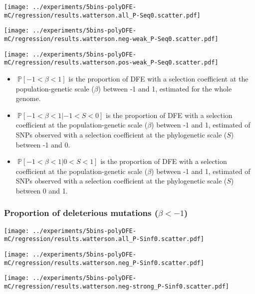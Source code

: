 \documentclass{article}
\newcommand{\proba}{\mathbb{P}}
\newcommand{\Sphy}{S}
\newcommand{\divWeakDel}{-1 < \Sphy < 0}
\newcommand{\divWeakAdv}{0 < \Sphy < 1}
\newcommand{\Spop}{\beta}
\newcommand{\polyDel}{\Spop < -1}
\newcommand{\polyNeutral}{-1 < \Spop < 1}
\begin{document}
    \begin{minipage}{0.32\linewidth}
        \texttt{[image: ../experiments/5bins-polyDFE-mC/regression/results.watterson.all\_P-Seq0.scatter.pdf]}
    \end{minipage}
    \begin{minipage}{0.32\linewidth}
        \texttt{[image: ../experiments/5bins-polyDFE-mC/regression/results.watterson.neg-weak\_P-Seq0.scatter.pdf]}
    \end{minipage}
    \begin{minipage}{0.32\linewidth}
        \texttt{[image: ../experiments/5bins-polyDFE-mC/regression/results.watterson.pos-weak\_P-Seq0.scatter.pdf]}
    \end{minipage}

    \begin{itemize}
        \item $\ \proba [ \polyNeutral ]$ is the proportion of DFE with a selection coefficient at the population-genetic scale ($\Spop$) between -1 and 1, estimated for the whole genome.
        \item $\ \proba [ \polyNeutral | \divWeakDel]$ is the proportion of DFE with a selection coefficient at the population-genetic scale ($\Spop$) between -1 and 1, estimated of SNPs observed with a selection coefficient at the phylogenetic scale ($\Sphy$) between -1 and 0.
        \item $\ \proba [ \polyNeutral | \divWeakAdv ]$ is the proportion of DFE with a selection coefficient at the population-genetic scale ($\Spop$) between -1 and 1, estimated of SNPs observed with a selection coefficient at the phylogenetic scale ($\Sphy$) between 0 and 1.
    \end{itemize}

    \subsubsection{Proportion of deleterious mutations ($\polyDel$)}

    \begin{minipage}{0.32\linewidth}
        \texttt{[image: ../experiments/5bins-polyDFE-mC/regression/results.watterson.all\_P-Sinf0.scatter.pdf]}
    \end{minipage}
    \begin{minipage}{0.32\linewidth}
        \texttt{[image: ../experiments/5bins-polyDFE-mC/regression/results.watterson.neg\_P-Sinf0.scatter.pdf]}
    \end{minipage}
    \begin{minipage}{0.32\linewidth}
        \texttt{[image: ../experiments/5bins-polyDFE-mC/regression/results.watterson.neg-strong\_P-Sinf0.scatter.pdf]}
    \end{minipage}
\end{document}
